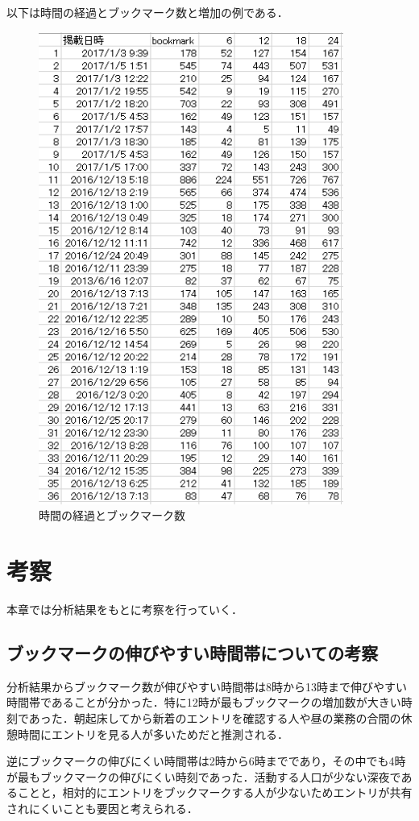 以下は時間の経過とブックマーク数と増加の例である．
\begin{figure}[htb]
\centering
\includegraphics[width=10cm]{24.PNG}
\caption{時間の経過とブックマーク数}\label{24}
\end{figure}

\chapter{考察}
本章では分析結果をもとに考察を行っていく．

\section{ブックマークの伸びやすい時間帯についての考察}
分析結果からブックマーク数が伸びやすい時間帯は8時から13時まで伸びやすい時間帯であることが分かった．特に12時が最もブックマークの増加数が大きい時刻であった．朝起床してから新着のエントリを確認する人や昼の業務の合間の休憩時間にエントリを見る人が多いためだと推測される．\par
逆にブックマークの伸びにくい時間帯は2時から6時までであり，その中でも4時が最もブックマークの伸びにくい時刻であった．活動する人口が少ない深夜であることと，相対的にエントリをブックマークする人が少ないためエントリが共有されにくいことも要因と考えられる．

